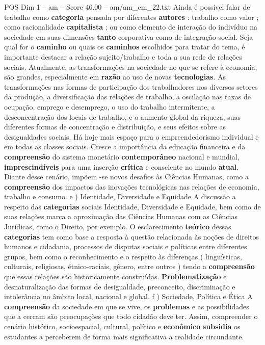 \begin{textsample}{POS Dim 1 – am – Score 46.00 – am/am\_em\_22.txt}
Ainda é possível falar de trabalho como \textbf{categoria} pensada por diferentes \textbf{autores} : trabalho como valor ; como racionalidade \textbf{capitalista} ; ou como elemento de interação do indivíduo na sociedade em suas dimensões \textbf{tanto} corporativa como de integração social.
Seja qual for o \textbf{caminho} ou quais os \textbf{caminhos} escolhidos para tratar do tema, é importante destacar a relação sujeito/trabalho e toda a sua rede de relações sociais.
Atualmente, as transformações na sociedade no que se refere à economia, são grandes, especialmente em \textbf{razão} ao uso de novas \textbf{tecnologias}.
As transformações nas formas de participação dos trabalhadores nos diversos setores da produção, a diversificação das relações de trabalho, a oscilação nas taxas de ocupação, emprego e desemprego, o uso do trabalho intermitente, a desconcentração dos locais de trabalho, e o aumento global da riqueza, suas diferentes formas de concentração e distribuição, e seus efeitos sobre as desigualdades sociais.
Há hoje mais espaço para o empreendedorismo individual e em todas as classes sociais.
Cresce a importância da educação financeira e da \textbf{compreensão} do sistema monetário \textbf{contemporâneo} nacional e mundial, \textbf{imprescindíveis} para uma inserção \textbf{crítica} e consciente no mundo \textbf{atual}.
Diante desse cenário, impõem -se novos desafios às Ciências Humanas, como a \textbf{compreensão} dos impactos das inovações tecnológicas nas relações de economia, trabalho e consumo. e ) Identidade, Diversidade e Equidade A discussão a respeito das \textbf{categorias} sociais Identidade, Diversidade e Equidade, bem como de suas relações marca a aproximação das Ciências Humanas com as Ciências Jurídicas, como o Direito, por exemplo.
O esclarecimento \textbf{teórico} dessas \textbf{categorias} tem como base a resposta à questão relacionada às noções de direitos humanos e cidadania, processos de disputas sociais e políticas entre diferentes grupos, bem como o reconhecimento e o respeito às diferenças ( linguísticas, culturais, religiosas, étnico-raciais, gênero, entre outros ) tendo a \textbf{compreensão} que essas relações são historicamente construídas. \textbf{Problematização} e desnaturalização das formas de desigualdade, preconceito, discriminação e intolerância no âmbito local, nacional e global. f ) Sociedade, Política e Ética A \textbf{compreensão} da sociedade em que se vive, os \textbf{problemas} e as possibilidades que a cercam são preocupações que todo cidadão deve ter.
Assim, compreender o cenário histórico, socioespacial, cultural, político e \textbf{econômico} \textbf{subsidia} os estudantes a perceberem de forma mais significativa a realidade circundante.

\end{textsample}
